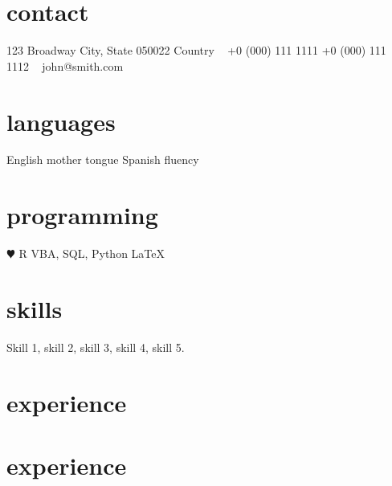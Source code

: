 \documentclass[]{cv-style}          %
\begin{document}

\lastupdated


\begin{aside}
%
\section{contact}
123 Broadway
City, State 050022
Country
~
+0 (000) 111 1111
+0 (000) 111 1112
~
john@smith.com
%
\section{languages}
English mother tongue
Spanish fluency
%
\section{programming}
{\color{red} $\varheartsuit$} R
VBA, SQL, Python
\LaTeX{}
%
\end{aside}


\section{skills}
\vspace{-0.2cm}

Skill 1, skill 2, skill 3, skill 4, skill 5.


\section{experience}
\section{experience}
\end{document}
